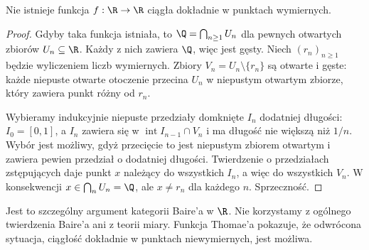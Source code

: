 \begin{wniosek}
\label{ma1:cor:no-rational-continuity}
Nie istnieje funkcja $f:\R\to\R$ ciągła dokładnie w punktach wymiernych.
\end{wniosek}
\begin{proof}
Gdyby taka funkcja istniała, to $\Q=\bigcap_{n\ge1}U_n$ dla pewnych otwartych zbiorów $U_n\subseteq\R$. Każdy z nich zawiera $\Q$, więc jest gęsty. Niech $(r_n)_{n\ge1}$ będzie wyliczeniem liczb wymiernych. Zbiory $V_n=U_n\setminus\{r_n\}$ są otwarte i gęste: każde niepuste otwarte otoczenie przecina $U_n$ w niepustym otwartym zbiorze, który zawiera punkt różny od $r_n$.

Wybieramy indukcyjnie niepuste przedziały domknięte $I_n$ dodatniej długości: $I_0=[0,1]$, a $I_n$ zawiera się w $\operatorname{int} I_{n-1}\cap V_n$ i ma długość nie większą niż $1/n$. Wybór jest możliwy, gdyż przecięcie to jest niepustym zbiorem otwartym i zawiera pewien przedział o dodatniej długości. Twierdzenie o przedziałach zstępujących daje punkt $x$ należący do wszystkich $I_n$, a więc do wszystkich $V_n$. W konsekwencji $x\in\bigcap_n U_n=\Q$, ale $x\ne r_n$ dla każdego $n$. Sprzeczność.
\end{proof}
Jest to szczególny argument kategorii Baire'a w $\R$. Nie korzystamy z ogólnego twierdzenia Baire'a ani z teorii miary. Funkcja Thomae'a pokazuje, że odwrócona sytuacja, ciągłość dokładnie w punktach niewymiernych, jest możliwa.
